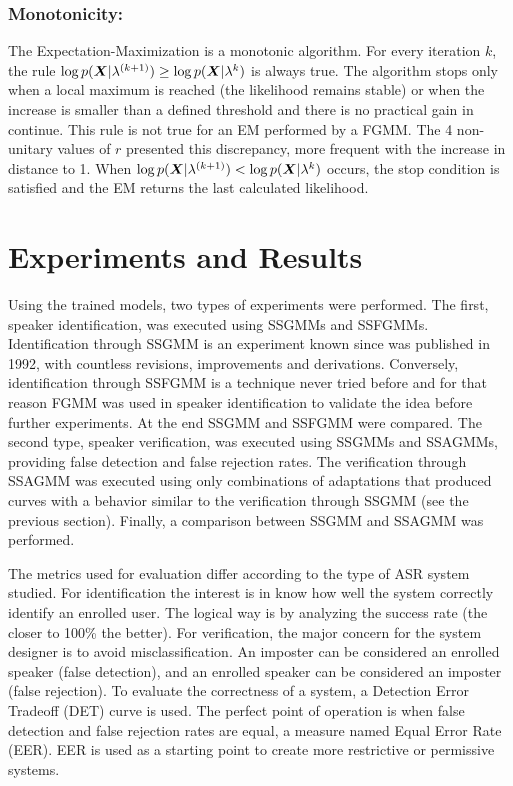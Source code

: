\subsubsection{Monotonicity:}

The Expectation-Maximization is a monotonic algorithm. For every iteration $k$, the rule $\log p(\boldsymbol{X}|\lambda^{(k+1)}) \geq \log p(\boldsymbol{X}|\lambda^{k})$ is always true. The algorithm stops only when a local maximum is reached (the likelihood remains stable) or when the increase is smaller than a defined threshold and there is no practical gain in continue. This rule is not true for an EM performed by a FGMM. The 4 non-unitary values of $r$ presented this discrepancy, more frequent with the increase in distance to 1. When $\log p(\boldsymbol{X}|\lambda^{(k+1)}) < \log p(\boldsymbol{X}|\lambda^{k})$ occurs, the stop condition is satisfied and the EM returns the last calculated likelihood.

\section{Experiments and Results}
\label{sec:experiments-and-results}

Using the trained models, two types of experiments were performed. The first, speaker identification, was executed using SSGMMs and SSFGMMs. Identification through SSGMM is an experiment known since  was published in 1992, with countless revisions, improvements and derivations. Conversely, identification through SSFGMM is a technique never tried before and for that reason FGMM was used in speaker identification to validate the idea before further experiments. At the end SSGMM and SSFGMM were compared. The second type, speaker verification, was executed using SSGMMs and SSAGMMs, providing false detection and false rejection rates. The verification through SSAGMM was executed using only combinations of adaptations that produced curves with a behavior similar to the verification through SSGMM (see the previous section). Finally, a comparison between SSGMM and SSAGMM was performed.

The metrics used for evaluation differ according to the type of ASR system studied. For identification the interest is in know how well the system correctly identify an enrolled user. The logical way is by analyzing the success rate (the closer to 100\% the better). For verification, the major concern for the system designer is to avoid misclassification. An imposter can be considered an enrolled speaker (false detection), and an enrolled speaker can be considered an imposter (false rejection). To evaluate the correctness of a system, a Detection Error Tradeoff (DET) curve is used. The perfect point of operation is when false detection and false rejection rates are equal, a measure named Equal Error Rate (EER). EER is used as a starting point to create more restrictive or permissive systems.

